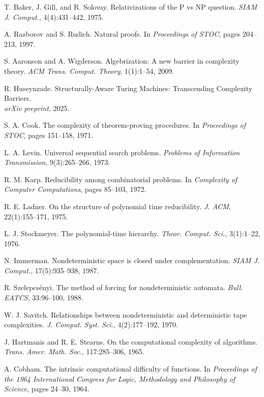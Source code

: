 \documentclass[11pt]{article}
\theoremstyle{definition}
\begin{document}
\begin{thebibliography}{99}
 T. Baker, J. Gill, and R. Solovay. Relativizations of the P vs NP question. \emph{SIAM J. Comput.}, 4(4):431--442, 1975.

 A. Razborov and S. Rudich. Natural proofs. In \emph{Proceedings of STOC}, pages 204--213, 1997.

 S. Aaronson and A. Wigderson. Algebrization: A new barrier in complexity theory. \emph{ACM Trans. Comput. Theory}, 1(1):1--54, 2009.

 R. Huseynzade. Structurally-Aware Turing Machines: Transcending Complexity Barriers. \\
\emph{arXiv preprint}, 2025.

 S. A. Cook. The complexity of theorem-proving procedures. In \emph{Proceedings of STOC}, pages 151--158, 1971.

 L. A. Levin. Universal sequential search problems. \emph{Problems of Information Transmission}, 9(3):265--266, 1973.

 R. M. Karp. Reducibility among combinatorial problems. In \emph{Complexity of Computer Computations}, pages 85--103, 1972.

 R. E. Ladner. On the structure of polynomial time reducibility. \emph{J. ACM}, 22(1):155--171, 1975.

 L. J. Stockmeyer. The polynomial-time hierarchy. \emph{Theor. Comput. Sci.}, 3(1):1--22, 1976.

 N. Immerman. Nondeterministic space is closed under complementation. \emph{SIAM J. Comput.}, 17(5):935--938, 1987.

 R. Szelepcsényi. The method of forcing for nondeterministic automata. \emph{Bull. EATCS}, 33:96--100, 1988.

 W. J. Savitch. Relationships between nondeterministic and deterministic tape complexities. \emph{J. Comput. Syst. Sci.}, 4(2):177--192, 1970.

 J. Hartmanis and R. E. Stearns. On the computational complexity of algorithms. \emph{Trans. Amer. Math. Soc.}, 117:285--306, 1965.

 A. Cobham. The intrinsic computational difficulty of functions. In \emph{Proceedings of the 1964 International Congress for Logic, Methodology and Philosophy of Science}, pages 24--30, 1964.


\end{thebibliography}
\end{document}
